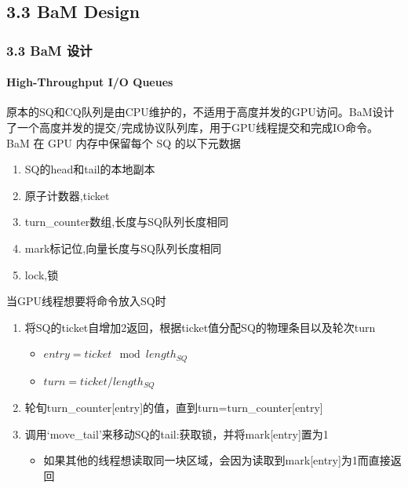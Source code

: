\documentclass[10pt]{ctexbeamer}
\begin{document}
\subsection{3.3 BaM Design}\label{sec:3-3}
\begin{frame}[t]
  \frametitle{3.3 BaM 设计}
  \framesubtitle{High-Throughput I/O Queues}
  原本的SQ和CQ队列是由CPU维护的，不适用于高度并发的GPU访问。BaM设计了一个高度并发的提交/完成协议队列库，用于GPU线程提交和完成IO命令。
  BaM 在 GPU 内存中保留每个 SQ 的以下元数据
  \begin{enumerate}
    \item SQ的head和tail的本地副本
    \item 原子计数器,ticket
    \item turn\_counter数组,长度与SQ队列长度相同
    \item mark标记位,向量长度与SQ队列长度相同
    \item lock,锁
  \end{enumerate}

\end{frame}

\begin{frame}
  当GPU线程想要将命令放入SQ时
  \begin{enumerate}
    \item 将SQ的ticket自增加2返回，根据ticket值分配SQ的物理条目以及轮次turn
    \begin{itemize}
      \item $ entry = ticket \mod length_{SQ} $
      \item $ turn = ticket/length_{SQ} $
    \end{itemize}
    \item 轮旬turn\_counter[entry]的值，直到turn=turn\_counter[entry]
    \item 调用`move\_tail'来移动SQ的tail:获取锁，并将mark[entry]置为1
    \begin{itemize}
      \item 如果其他的线程想读取同一块区域，会因为读取到mark[entry]为1而直接返回
    \end{itemize}

  \end{enumerate}
  
\end{frame}
\end{document}
